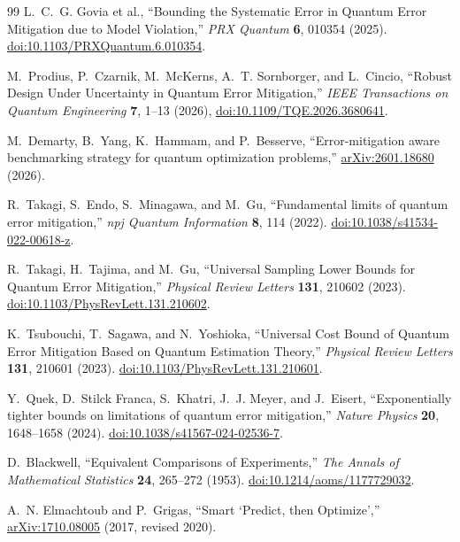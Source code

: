 \documentclass[a4paper,onecolumn,unpublished,nopdfoutputerror]{quantumarticle}
\theoremstyle{plain}
\theoremstyle{definition}
\newcommand{\1}{\mathbf{1}}
\begin{document}
\begin{thebibliography}{99}
L.~C.~G. Govia et al.,
``Bounding the Systematic Error in Quantum Error Mitigation due to Model Violation,''
\emph{PRX Quantum} \textbf{6}, 010354 (2025). \href{https://doi.org/10.1103/PRXQuantum.6.010354}{doi:10.1103/PRXQuantum.6.010354}.

M.~Prodius, P.~Czarnik, M.~McKerns, A.~T. Sornborger, and L.~Cincio,
``Robust Design Under Uncertainty in Quantum Error Mitigation,''
\emph{IEEE Transactions on Quantum Engineering} \textbf{7}, 1--13 (2026),
\href{https://doi.org/10.1109/TQE.2026.3680641}{doi:10.1109/TQE.2026.3680641}.

M.~Demarty, B.~Yang, K.~Hammam, and P.~Besserve,
``Error-mitigation aware benchmarking strategy for quantum optimization problems,''
\href{https://arxiv.org/abs/2601.18680}{arXiv:2601.18680} (2026).

R.~Takagi, S.~Endo, S.~Minagawa, and M.~Gu,
``Fundamental limits of quantum error mitigation,''
\emph{npj Quantum Information} \textbf{8}, 114 (2022). \href{https://doi.org/10.1038/s41534-022-00618-z}{doi:10.1038/s41534-022-00618-z}.

R.~Takagi, H.~Tajima, and M.~Gu,
``Universal Sampling Lower Bounds for Quantum Error Mitigation,''
\emph{Physical Review Letters} \textbf{131}, 210602 (2023). \href{https://doi.org/10.1103/PhysRevLett.131.210602}{doi:10.1103/PhysRevLett.131.210602}.

K.~Tsubouchi, T.~Sagawa, and N.~Yoshioka,
``Universal Cost Bound of Quantum Error Mitigation Based on Quantum Estimation Theory,''
\emph{Physical Review Letters} \textbf{131}, 210601 (2023). \href{https://doi.org/10.1103/PhysRevLett.131.210601}{doi:10.1103/PhysRevLett.131.210601}.

Y.~Quek, D.~Stilck Franca, S.~Khatri, J.~J. Meyer, and J.~Eisert,
``Exponentially tighter bounds on limitations of quantum error mitigation,''
\emph{Nature Physics} \textbf{20}, 1648--1658 (2024). \href{https://doi.org/10.1038/s41567-024-02536-7}{doi:10.1038/s41567-024-02536-7}.

D.~Blackwell,
``Equivalent Comparisons of Experiments,''
\emph{The Annals of Mathematical Statistics} \textbf{24}, 265--272 (1953). \href{https://doi.org/10.1214/aoms/1177729032}{doi:10.1214/aoms/1177729032}.

A.~N. Elmachtoub and P.~Grigas,
``Smart `Predict, then Optimize',''
\href{https://arxiv.org/abs/1710.08005}{arXiv:1710.08005} (2017, revised 2020).


\end{thebibliography}
\end{document}
